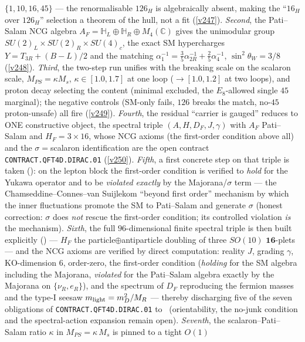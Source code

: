 $\{1,10,16,45\}$ --- the renormalisable $126_H$ is algebraically absent, making the
``$16_H$ over $126_H$'' selection a theorem of the hull, not a fit (\vref{v247}). \emph{Second}, the
Pati--Salam NCG algebra $A_F=\mathbb H_L\oplus\mathbb H_R\oplus M_4(\mathbb C)$ gives the unimodular group
$SU(2)_L{\times}SU(2)_R{\times}SU(4)_c$, the exact SM hypercharges $Y=T_{3R}+(B{-}L)/2$ and the matching
$\alpha_1^{-1}=\tfrac35\alpha_{2R}^{-1}+\tfrac25\alpha_4^{-1}$, $\sin^2\theta_W=3/8$ (\vref{v248}).
\emph{Third}, the two-step run unifies with the breaking scale on the scalaron scale, $M_{PS}=\kappa M_s$,
$\kappa\in[1.0,1.7]$ at one loop ($\to[1.0,1.2]$ at two loops), and proton decay selecting the content
(minimal excluded, the $E_8$-allowed single $45$ marginal); the negative controls (SM-only fails, $126$
breaks the match, no-$45$ proton-unsafe) all fire (\vref{v249}). \emph{Fourth}, the residual ``carrier is
gauged'' reduces to ONE constructive object, the spectral triple $(A,H,D_F,J,\gamma)$ with $A_F$
Pati--Salam and $H_F=3{\times}16$, whose NCG axioms (the first-order condition above all) and the
$\sigma=$scalaron identification are the open contract \texttt{CONTRACT.QFT4D.DIRAC.01} (\vref{v250}).
\emph{Fifth}, a first concrete step on that triple is taken (): on the
lepton block the first-order condition is verified to \emph{hold} for the Yukawa operator and to be
\emph{violated exactly} by the Majorana/$\sigma$ term --- the Chamseddine--Connes--van Suijlekom ``beyond
first order'' mechanism by which the inner fluctuations promote the SM to Pati--Salam and generate $\sigma$
(honest correction: $\sigma$ does \emph{not} rescue the first-order condition; its controlled violation
\emph{is} the mechanism).
\emph{Sixth}, the full $96$-dimensional finite spectral triple is then built explicitly
() --- $H_F$ the particle$\oplus$antiparticle doubling of three $SO(10)$
$\mathbf{16}$-plets --- and the NCG axioms are verified by direct computation: reality $J$, grading $\gamma$,
KO-dimension $6$, order-zero, the first-order condition (\emph{holding} for the SM algebra including the
Majorana, \emph{violated} for the Pati--Salam algebra exactly by the Majorana on $\{\nu_R,e_R\}$), and the
spectrum of $D_F$ reproducing the fermion masses and the type-I seesaw $m_{\rm light}=m_D^2/M_R$ --- thereby
discharging five of the seven obligations of \texttt{CONTRACT.QFT4D.DIRAC.01} to \mE\ (orientability, the
no-junk condition and the spectral-action expansion remain open).
\emph{Seventh}, the scalaron--Pati--Salam ratio $\kappa$ in $M_{PS}=\kappa\,M_s$ is pinned to a tight $O(1)$
